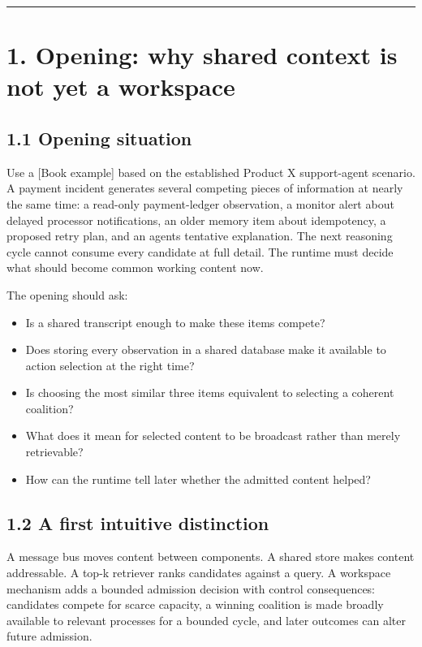 \begin{center}\rule{0.5\linewidth}{0.5pt}\end{center}

\section{1. Opening: why shared context is not yet a workspace}\label{1-opening-why-shared-context-is-not-yet-a-workspace}

\subsection{1.1 Opening situation}\label{11-opening-situation}

Use a {[}Book example{]} based on the established Product X support-agent scenario. A payment incident generates several competing pieces of information at nearly the same time: a read-only payment-ledger observation, a monitor alert about delayed processor notifications, an older memory item about idempotency, a proposed retry plan, and an agent\textquotesingle s tentative explanation. The next reasoning cycle cannot consume every candidate at full detail. The runtime must decide what should become common working content now.

The opening should ask:

\begin{itemize}
\tightlist
\item
  Is a shared transcript enough to make these items compete?
\item
  Does storing every observation in a shared database make it available to action selection at the right time?
\item
  Is choosing the most similar three items equivalent to selecting a coherent coalition?
\item
  What does it mean for selected content to be broadcast rather than merely retrievable?
\item
  How can the runtime tell later whether the admitted content helped?
\end{itemize}

\subsection{1.2 A first intuitive distinction}\label{12-a-first-intuitive-distinction}

A message bus moves content between components. A shared store makes content addressable. A top-k retriever ranks candidates against a query. A workspace mechanism adds a bounded admission decision with control consequences: candidates compete for scarce capacity, a winning coalition is made broadly available to relevant processes for a bounded cycle, and later outcomes can alter future admission.

